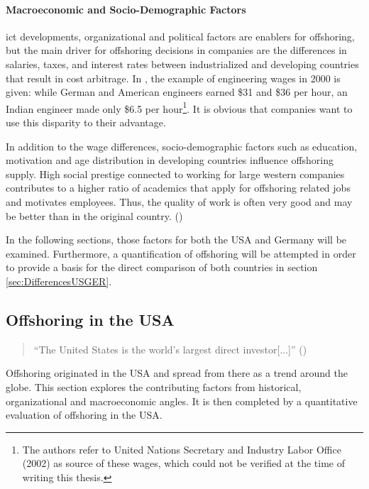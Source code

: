 \paragraph{Macroeconomic and Socio-Demographic Factors}
\Gls{ict} developments, organizational and political factors are enablers for offshoring, but the main driver for offshoring decisions in companies are the differences in salaries, taxes, and interest rates between industrialized and developing countries that result in cost arbitrage. In \cite[p. 89]{Jahns.2007}, the example of engineering wages in 2000 is given: while German and American engineers earned \$31 and \$36 per hour, an Indian engineer made only \$6.5 per hour\footnote{The authors refer to United Nations Secretary and Industry Labor Office (2002) as source of these wages, which could not be verified at the time of writing this thesis.}. It is obvious that companies want to use this disparity to their advantage.

In addition to the wage differences, socio-demographic factors such as education, motivation and age distribution in developing countries influence offshoring supply. High social prestige connected to working for large western companies contributes to a higher ratio of academics that apply for offshoring related jobs and motivates employees. Thus, the quality of work is often very good and may be better than in the original country. (\cite[p. 93]{Jahns.2007})

In the following sections, those factors for both the USA and Germany will be examined. Furthermore, a quantification of offshoring will be attempted in order to provide a basis for the direct comparison of both countries in section \ref{sec:DifferencesUSGER}.
\newpage
\subsection{Offshoring in the USA}
\label{sec:OffshoringUS}

\begin{quote}
	``The United States is the world's largest direct investor[...]'' \linebreak(\cite[p. 3]{Kozlow.2006})
\end{quote}

Offshoring originated in the USA and spread from there as a trend around the globe. This section explores the contributing factors from historical, organizational and macroeconomic angles. It is then completed by a quantitative evaluation of offshoring in the USA.

